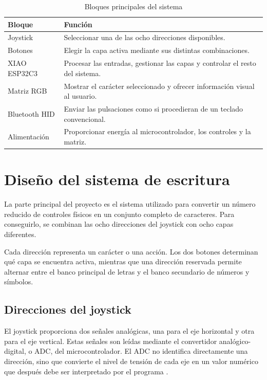 \begin{table}[ht]
    \centering
    \caption{Bloques principales del sistema}
    \label{tab:bloques-sistema}
    \begin{tabularx}{\textwidth}{@{}lX@{}}
        \toprule
        \textbf{Bloque} & \textbf{Función} \\
        \midrule
        Joystick & Seleccionar una de las ocho direcciones disponibles. \\
        Botones & Elegir la capa activa mediante sus distintas combinaciones. \\
        XIAO ESP32C3 & Procesar las entradas, gestionar las capas y controlar el resto del sistema. \\
        Matriz RGB & Mostrar el carácter seleccionado y ofrecer información visual al usuario. \\
        Bluetooth HID & Enviar las pulsaciones como si procedieran de un teclado convencional. \\
        Alimentación & Proporcionar energía al microcontrolador, los controles y la matriz. \\
        \bottomrule
    \end{tabularx}
\end{table}

\section{Diseño del sistema de escritura}
\label{sec:sistema-escritura}

La parte principal del proyecto es el sistema utilizado para convertir un número reducido de controles físicos en un conjunto completo de caracteres. Para conseguirlo, se combinan las ocho direcciones del joystick con ocho capas diferentes.

Cada dirección representa un carácter o una acción. Los dos botones determinan qué capa se encuentra activa, mientras que una dirección reservada permite alternar entre el banco principal de letras y el banco secundario de números y símbolos.

\subsection{Direcciones del joystick}
\label{subsec:direcciones-joystick}

El joystick proporciona dos señales analógicas, una para el eje horizontal y otra para el eje vertical. Estas señales son leídas mediante el convertidor analógico-digital, o ADC, del microcontrolador. El ADC no identifica directamente una dirección, sino que convierte el nivel de tensión de cada eje en un valor numérico que después debe ser interpretado por el programa \cite{espressifADCOneshot}.

